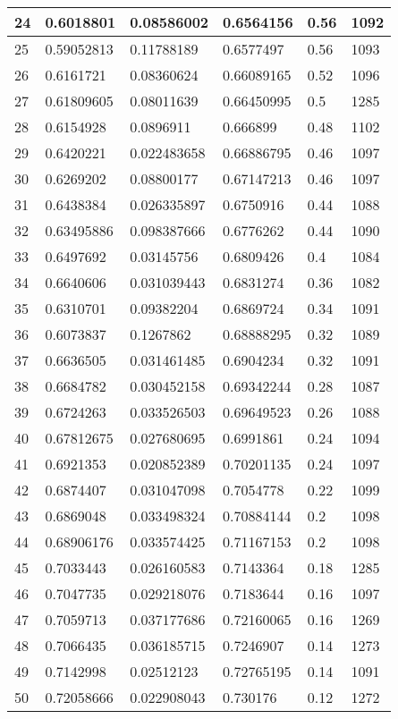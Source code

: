 \begin{longtable}{|l|l|l|l|l|l|}
24 & 0.6018801 & 0.08586002 & 0.6564156 & 0.56 & 1092 \\ \hline 
25 & 0.59052813 & 0.11788189 & 0.6577497 & 0.56 & 1093 \\ \hline 
26 & 0.6161721 & 0.08360624 & 0.66089165 & 0.52 & 1096 \\ \hline 
27 & 0.61809605 & 0.08011639 & 0.66450995 & 0.5 & 1285 \\ \hline 
28 & 0.6154928 & 0.0896911 & 0.666899 & 0.48 & 1102 \\ \hline 
29 & 0.6420221 & 0.022483658 & 0.66886795 & 0.46 & 1097 \\ \hline 
30 & 0.6269202 & 0.08800177 & 0.67147213 & 0.46 & 1097 \\ \hline 
31 & 0.6438384 & 0.026335897 & 0.6750916 & 0.44 & 1088 \\ \hline 
32 & 0.63495886 & 0.098387666 & 0.6776262 & 0.44 & 1090 \\ \hline 
33 & 0.6497692 & 0.03145756 & 0.6809426 & 0.4 & 1084 \\ \hline 
34 & 0.6640606 & 0.031039443 & 0.6831274 & 0.36 & 1082 \\ \hline 
35 & 0.6310701 & 0.09382204 & 0.6869724 & 0.34 & 1091 \\ \hline 
36 & 0.6073837 & 0.1267862 & 0.68888295 & 0.32 & 1089 \\ \hline 
37 & 0.6636505 & 0.031461485 & 0.6904234 & 0.32 & 1091 \\ \hline 
38 & 0.6684782 & 0.030452158 & 0.69342244 & 0.28 & 1087 \\ \hline 
39 & 0.6724263 & 0.033526503 & 0.69649523 & 0.26 & 1088 \\ \hline 
40 & 0.67812675 & 0.027680695 & 0.6991861 & 0.24 & 1094 \\ \hline 
41 & 0.6921353 & 0.020852389 & 0.70201135 & 0.24 & 1097 \\ \hline 
42 & 0.6874407 & 0.031047098 & 0.7054778 & 0.22 & 1099 \\ \hline 
43 & 0.6869048 & 0.033498324 & 0.70884144 & 0.2 & 1098 \\ \hline 
44 & 0.68906176 & 0.033574425 & 0.71167153 & 0.2 & 1098 \\ \hline 
45 & 0.7033443 & 0.026160583 & 0.7143364 & 0.18 & 1285 \\ \hline 
46 & 0.7047735 & 0.029218076 & 0.7183644 & 0.16 & 1097 \\ \hline 
47 & 0.7059713 & 0.037177686 & 0.72160065 & 0.16 & 1269 \\ \hline 
48 & 0.7066435 & 0.036185715 & 0.7246907 & 0.14 & 1273 \\ \hline 
49 & 0.7142998 & 0.02512123 & 0.72765195 & 0.14 & 1091 \\ \hline 
50 & 0.72058666 & 0.022908043 & 0.730176 & 0.12 & 1272 \\ \hline 
\end{longtable}